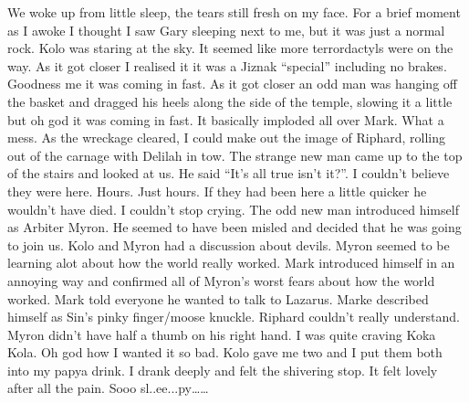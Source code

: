\begin{multicols}{2}
We woke up from little sleep, the tears still fresh on my face. For a brief moment as I awoke I thought I saw Gary sleeping next to me, but it was just a normal rock. Kolo was staring at the sky. It seemed like more terrordactyls were on the way. As it got closer I realised it it was a Jiznak “special” including no brakes. Goodness me it was coming in fast. As it got closer an odd man was hanging off the basket and dragged his heels along the side of the temple, slowing it a little but oh god it was coming in fast. It basically imploded all over Mark. What a mess. As the wreckage cleared, I could make out the image of Riphard, rolling out of the carnage with Delilah in tow. The strange new man came up to the top of the stairs and looked at us. He said “It’s all true isn’t it?”. I couldn’t believe they were here. Hours. Just hours. If they had been here a little quicker he wouldn’t have died. I couldn’t stop crying. The odd new man introduced himself as Arbiter Myron. He seemed to have been misled and decided that he was going to join us. Kolo and Myron had a discussion about devils. Myron seemed to be learning alot about how the world really worked. Mark introduced himself in an annoying way and confirmed all of Myron’s worst fears about how the world worked. Mark told everyone he wanted to talk to Lazarus. Marke described himself as Sin’s pinky finger/moose knuckle. Riphard couldn’t really understand. Myron didn’t have half a thumb on his right hand. I was quite craving Koka Kola. Oh god how I wanted it so bad. Kolo gave me two and I put them both into my papya drink. I drank deeply and felt the shivering stop. It felt lovely after all the pain. Sooo sl..ee...py……\medskip


\end{multicols}
